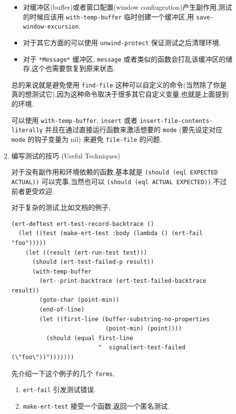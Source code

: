 \documentclass[11pt]{article}
\begin{document}
\begin{enumerate}
\begin{enumerate}
\begin{itemize}
\item 对缓冲区(buffer)或者窗口配置(window confiugration)产生副作用,测试的时候应该用 \texttt{with-temp-buffer} 临时创建一个缓冲区,用 \texttt{save-window-excursion}.

\item 对于其它方面的可以使用 \texttt{unwind-protect} 保证测试之后清理环境.

\item 对于 \texttt{*Message*} 缓冲区, \texttt{message} 或者类似的函数会打乱该缓冲区的储存,这个也需要恢复到原来状态.
\end{itemize}

总的来说就是避免使用 \texttt{find-file} 这种可以自定义的命令(当然除了你是真的想测试它),因为这种命令取决于很多其它自定义变量,也就是上面提到的环境.

可以使用 \texttt{with-temp-buffer}, \texttt{insert} 或者 \texttt{insert-file-contents-literally} 并且在通过直接运行函数来激活想要的 \texttt{mode} (要先设定对应 \texttt{mode} 的钩子变量为 nil) 来避免 \texttt{file-file} 的问题.


\item 编写测试的技巧 (Useful Techniques)
\label{sec:orgb845462}

对于没有副作用和环境依赖的函数,基本就是 \texttt{(should (eql EXPECTED ACTUAL))} 可以完事,当然也可以 \texttt{(should (eql ACTUAL EXPECTED))},不过前者更受欢迎.

对于复杂的测试,比如文档的例子,

\begin{verbatim}
(ert-deftest ert-test-record-backtrace ()
  (let ((test (make-ert-test :body (lambda () (ert-fail "foo")))))
    (let ((result (ert-run-test test)))
      (should (ert-test-failed-p result))
      (with-temp-buffer
        (ert--print-backtrace (ert-test-failed-backtrace result))
        (goto-char (point-min))
        (end-of-line)
        (let ((first-line (buffer-substring-no-properties
                           (point-min) (point))))
          (should (equal first-line
                         "  signal(ert-test-failed (\"foo\"))")))))))
\end{verbatim}

先介绍一下这个例子的几个 \texttt{forms},

\begin{enumerate}
\item \texttt{ert-fail} 引发测试错误.

\item \texttt{make-ert-test} 接受一个函数,返回一个匿名测试.


\end{enumerate}
\end{enumerate}
\end{enumerate}
\end{document}
